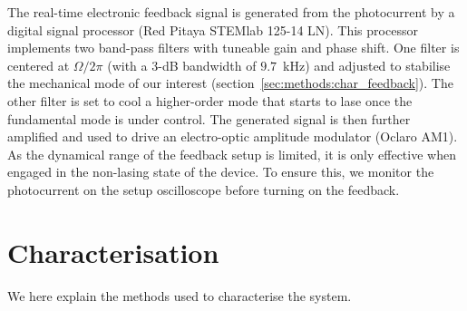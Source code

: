 \documentclass[./Main-revtex.tex]{subfiles}
\begin{document}
The real-time electronic feedback signal is generated from the photocurrent by a digital signal processor (Red Pitaya STEMlab 125-14 LN). This processor implements two band-pass filters with tuneable gain and phase shift. One filter is centered at $\Omega/2\pi$ (with a $3$-dB bandwidth of $9.7$~kHz) and adjusted to stabilise the mechanical mode of our interest (section~\ref{sec:methods:char_feedback}). The other filter is set to cool a higher-order mode that starts to lase once the fundamental mode is under control.
The generated signal is then further amplified and used to drive an electro-optic amplitude modulator (Oclaro AM1). %
As the dynamical range of the feedback setup is limited, it is only effective when engaged in the non-lasing state of the device. To ensure this, we monitor the photocurrent on the setup oscilloscope before turning on the feedback.

\section{Characterisation}
\label{sec:methods:characterisation}
We here explain the methods used to characterise the system. 
\end{document}

